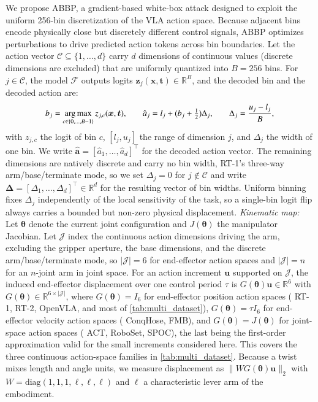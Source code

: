 {} 
We propose ABBP, a gradient-based white-box attack designed to exploit the uniform 256-bin discretization of the VLA action space. Because adjacent bins encode physically close but discretely different control signals, ABBP optimizes perturbations to drive predicted action tokens across bin boundaries.
Let the action vector $\mathcal{C}\subseteq\{1,\dots,d\}$ carry $d$ dimensions of continuous values (discrete dimensions are excluded)
 that are uniformly quantized into $B{=}256$ bins. For $j\in\mathcal{C}$, the model $\mathcal{F}$ outputs logits $\bm{z}_j(\bm{x},\bm{t})\in\mathbb{R}^{B}$, and the decoded bin and the decoded action are:
\begin{equation}
  \small
b_j=\argmax_{c\in\{0,\dots,B-1\}} z_{j,c}(\bm{x},\bm{t}),
\qquad
\hat a_j=l_j+\bigl(b_j+\tfrac{1}{2}\bigr)\Delta_j,
\qquad
\Delta_j=\frac{u_j-l_j}{B},
\label{eq:abbp-quant}
\vspace{-1.5ex}\end{equation}
with $z_{j,c}$ the logit of bin $c$, $[l_j,u_j]$ the range of dimension $j$, and $\Delta_j$ the width of one bin. We write $\hat{\bm{a}}=[\hat a_1,\dots,\hat a_d]^{\top}$ for the decoded action vector. The remaining dimensions are natively discrete and carry no bin width, {\eg} RT-1's three-way arm/base/terminate mode, so we set $\Delta_j{=}0$ for $j\notin\mathcal{C}$ and write $\bm{\Delta}=[\Delta_1,\dots,\Delta_d]^{\top}\in\mathbb{R}^{d}$ for the resulting vector of bin widths. 
Uniform binning fixes $\Delta_j$ independently of the local sensitivity of the task, so a single-bin logit flip always carries a bounded but non-zero physical displacement. 
\emph{Kinematic map:} Let $\bm{\theta}$ denote the current joint configuration and $J(\bm{\theta})$ the manipulator Jacobian. Let $\mathcal{J}$ index the continuous action dimensions driving the arm, excluding the gripper aperture, the base dimensions, and the discrete arm/base/terminate mode, so $|\mathcal{J}|{=}6$ for end-effector action spaces and $|\mathcal{J}|{=}n$ for an $n$-joint arm in joint space. For an action increment $\bm{u}$ supported on $\mathcal{J}$, the induced end-effector displacement over one control period $\tau$ is $G(\bm{\theta})\bm{u}\in\mathbb{R}^{6}$ with $G(\bm{\theta})\in\mathbb{R}^{6\times|\mathcal{J}|}$, where $G(\bm{\theta})=I_{6}$ for end-effector position action spaces ({\eg} RT-1, RT-2, OpenVLA, and most of \autoref{tab:multi_dataset}), $G(\bm{\theta})=\tau I_{6}$ for end-effector velocity action spaces ({\eg} ConqHose, FMB), and $G(\bm{\theta})=J(\bm{\theta})$ for joint-space action spaces ({\eg} ACT, RoboSet, SPOC), the last being the first-order approximation valid for the small increments considered here. This covers the three continuous action-space families in \autoref{tab:multi_dataset}. %
Because a twist mixes length and angle units, we measure displacement as $\|W G(\bm{\theta})\bm{u}\|_{2}$ with $W=\mathrm{diag}(1,1,1,\ell,\ell,\ell)$ and $\ell$ a characteristic lever arm of the embodiment.

